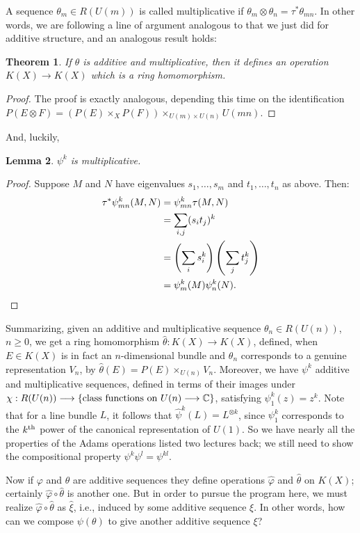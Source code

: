 \documentclass{article}
\newcommand{\C}{\mathbb{C}}
\renewcommand{\to}{\longrightarrow}
\newtheorem{thm}{Theorem}[section]
\newtheorem{lem}[thm]{Lemma}
\theoremstyle{definition}
\begin{document}
A sequence $\theta_m \in R(U(m))$ is called multiplicative if $\theta_m \otimes \theta_n = \tau^* \theta_{mn}$.  In other words, we are following a line of argument analogous to that we just did for additive structure, and an analogous result holds:
\begin{thm}
If $\theta$ is additive and multiplicative, then it defines an operation $K(X) \to K(X)$ which is a ring homomorphism.
\end{thm}
\begin{proof}
The proof is exactly analogous, depending this time on the identification $P(E \otimes F) = (P(E) \times_X P(F)) \times_{U(m) \times U(n)} U(mn)$.
\end{proof}

And, luckily,
\begin{lem}
$\psi^k$ is multiplicative.
\end{lem}
\begin{proof}Suppose $M$ and $N$ have eigenvalues $s_1, \ldots, s_m$ and $t_1, \ldots, t_n$ as above. Then:
\begin{align*}
\tau^* \psi^k_{mn}(M, N) & = \psi^k_{mn} \tau(M, N) \\
& = \sum_{i, j}(s_i t_j)^k \\
& = \left( \sum_i s_i^k \right) \left( \sum_j t_j^k \right) \\
& = \psi^k_m(M) \psi^k_n(N).\qedhere
\end{align*}
\end{proof}

Summarizing, given an additive and multiplicative sequence $\theta_n \in R(U(n))$, $n \ge 0$, we get a ring homomorphism $\hat \theta: K(X) \to K(X)$, defined, when $E \in K(X)$ is in fact an $n$-dimensional bundle and $\theta_n$ corresponds to a genuine representation $V_n$, by $\hat \theta(E) = P(E) \times_{U(n)} V_n$.  Moreover, we have $\psi^k$ additive and multiplicative sequences, defined in terms of their images under $\chi: R(U(n)) \to \{\hbox{class functions on $U(n) \to \C$}\}$, satisfying $\psi^k_1(z) = z^k$.  Note that for a line bundle $L$, it follows that $\hat \psi^k(L) = L^{\otimes k}$, since $\psi^k_1$ corresponds to the $k^\textup{th}$ power of the canonical representation of $U(1)$.  So we have nearly all the properties of the Adams operations listed two lectures back; we still need to show the compositional property $\psi^k \psi^l = \psi^{kl}$.

Now if $\varphi$ and $\theta$ are additive sequences they define operations $\hat \varphi$ and $\hat \theta$ on $K(X)$; certainly $\hat \varphi \circ \hat \theta$ is another one.  But in order to pursue the program here, we must realize $\hat \varphi \circ \hat \theta$ as $\hat \xi$, i.e., induced by some additive sequence $\xi$.  In other words, how can we compose $\psi (\theta)$ to give another additive sequence $\xi$?
\end{document}
